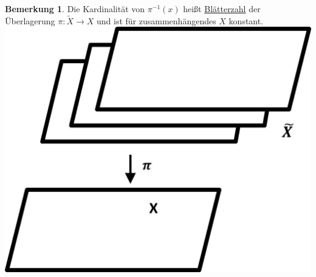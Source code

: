 \documentclass[a4paper,11pt,notitlepage]{report}
\theoremstyle{definition}
\newtheorem{remark}{Bemerkung}[chapter]
\begin{document}
\begin{remark}
	Die Kardinalität von $\pi^{-1}(x)$ heißt \underline{Blätterzahl} der Überlagerung $\pi \colon \tilde{X} \rightarrow X$ und ist für zusammenhängendes $X$ konstant.
	\newline \includegraphics[scale=0.4]{images/Blaetterzahl.jpg}
\end{remark}
\end{document}

